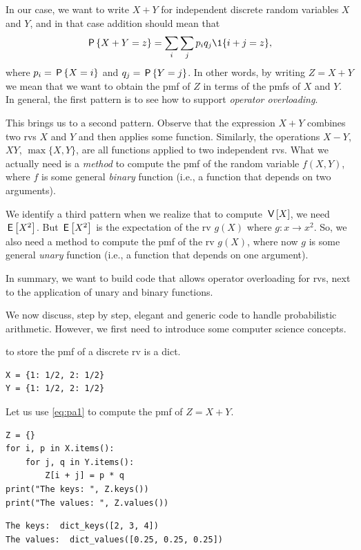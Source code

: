 \documentclass[queueing-book]{subfiles}
\begin{document}
In our case, we want to write \(X+Y\) for independent discrete random variables \(X\) and \(Y\), and in that case addition should  mean that
\begin{equation}
\label{eq:pa1}
\P{X+Y=z} = \sum_{i} \sum_{j} p_{i} q_{j} \1{i+j=z},
\end{equation}
where \(p_{i} = \P{X=i}\) and \(q_j = \P{Y=j}\).
In other words, by writing \(Z=X+Y\) we mean that we want to obtain the pmf of \(Z\) in terms of the pmfs of \(X\) and \(Y\).
In general, the first pattern is to see how to support \emph{operator overloading}.


This brings us to a second pattern.
Observe that the expression \(X+Y\) combines two rvs \(X\) and \(Y\) and then applies some function.
Similarly, the operations \(X-Y\), \(XY\), \(\max\{X, Y\}\), are all functions applied to two independent rvs.
What we actually need is a \emph{method} to compute the pmf of the random variable \(f(X,Y)\), where \(f\) is some general \emph{binary} function (i.e., a function that depends on two arguments).

We identify a third pattern when we realize that to compute \(\V X\), we need \(\E{X^{2}}\).
But \(\E{X^{2}}\) is the expectation of the rv \(g(X)\) where \(g:x \to x^{2}\).
So, we also need a method to compute the pmf of the rv \(g(X)\), where now \(g\) is some general \emph{unary} function (i.e., a function that depends on one argument).

In summary, we want to build code  that allows operator overloading for rvs, next to the application of unary and binary functions.

We now discuss, step by step, elegant and generic code to handle probabilistic arithmetic. However, we first need to introduce some computer science concepts.


 to store the pmf of a discrete rv is a dict.
\begin{verbatim}
X = {1: 1/2, 2: 1/2}
Y = {1: 1/2, 2: 1/2}
\end{verbatim}

Let us use \cref{eq:pa1} to compute the pmf of \(Z=X+Y\).
\begin{verbatim}
Z = {}
for i, p in X.items():
    for j, q in Y.items():
        Z[i + j] = p * q
print("The keys: ", Z.keys())
print("The values: ", Z.values())
\end{verbatim}

\begin{verbatim}
The keys:  dict_keys([2, 3, 4])
The values:  dict_values([0.25, 0.25, 0.25])
\end{verbatim}
\end{document}
